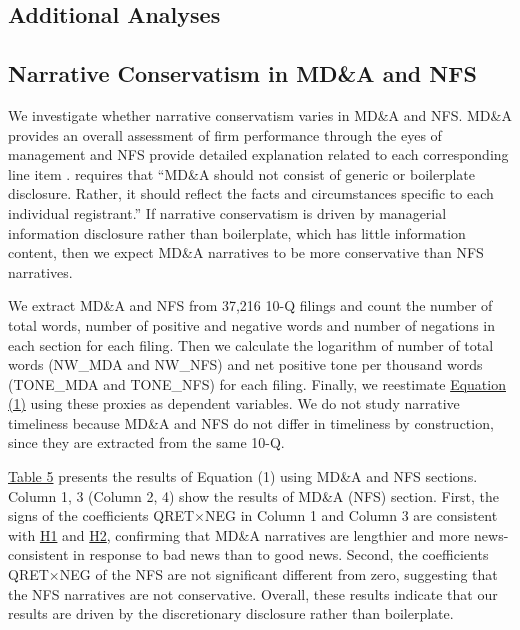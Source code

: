 \documentclass[letterpaper,12pt]{article}
\begin{document}
\begin{spacing}{1.5}
\section{Additional Analyses}
\subsection{Narrative Conservatism in MD\&A and NFS}
\noindent We investigate whether narrative conservatism varies in MD\&A and NFS. MD\&A provides an overall assessment of firm performance through the eyes of management and NFS provide detailed explanation related to each corresponding line item \cite{fasbConceptualFrameworkFinancial2018a, secFinancialReportingManual2019}.  requires that ``MD\&A should not consist of generic or boilerplate disclosure. Rather, it should reflect the facts and circumstances specific to each individual registrant.'' If narrative conservatism is driven by managerial information disclosure rather than boilerplate, which has little information content, then we expect MD\&A narratives to be more conservative than NFS narratives.

We extract MD\&A and NFS from 37,216 10-Q filings and count the number of total words, number of positive and negative words and number of negations in each section for each filing. Then we calculate the logarithm of number of total words (NW\_MDA and NW\_NFS) and net positive tone per thousand words (TONE\_MDA and TONE\_NFS) for each filing. Finally, we reestimate \hyperref[eq1]{Equation (1)} using these proxies as dependent variables. We do not study narrative timeliness because MD\&A and NFS do not differ in timeliness by construction, since they are extracted from the same 10-Q.

\hyperref[T5]{Table 5} presents the results of Equation (1) using MD\&A and NFS sections. Column 1, 3 (Column 2, 4) show the results of MD\&A (NFS) section. First, the signs of the coefficients QRET$\times$NEG in Column 1 and Column 3 are consistent with \hyperref[h1]{H1} and \hyperref[h2]{H2}, confirming that MD\&A narratives are lengthier and more news-consistent in response to bad news than to good news. Second, the coefficients QRET$\times$NEG of the NFS are not significant different from zero, suggesting that the NFS narratives are not conservative. Overall, these results indicate that our results are driven by the discretionary disclosure rather than boilerplate.


\end{spacing}
\end{document}
